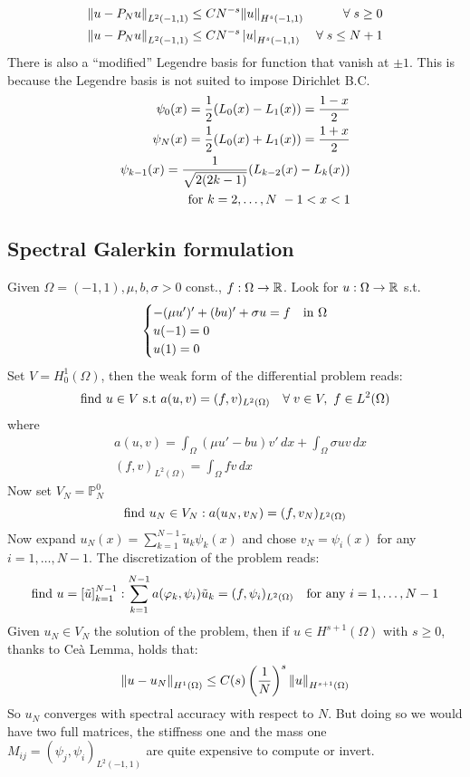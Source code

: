 \begin{align*}
    \norm{u-P_Nu}_{L^2(-1,1)} &\leq CN^{-s} \norm{u}_{H^s(-1,1)} & \forall \; s \geq 0 \\
    \norm{u-P_Nu}_{L^2(-1,1)} &\leq CN^{-s} \left\lvert u\right\rvert_{H^s(-1,1)} & \forall \; s \leq N+1 \\
\end{align*}
There is also a ``modified'' Legendre basis for function that vanish at \(\pm 1\). This is because the Legendre basis is not suited to impose Dirichlet B.C.
\begin{align*}
    \psi_0(x) = \frac{1}{2} (L_0(x) - L_1(x)) = \frac{1-x}{2} \\ 
    \psi_N(x) = \frac{1}{2} (L_0(x) + L_1(x)) = \frac{1+x}{2} \\ 
    \psi_{k-1}(x) = \frac{1}{\sqrt{2(2k-1)}} (L_{k-2}(x) - L_k(x))\\ 
    \text{for } k = 2, \ldots, N \ -1 < x < 1 \\ 
\end{align*}

\subsection{Spectral Galerkin formulation}
Given \(\Omega = (-1, 1), \mu, b, \sigma > 0\) const., \(f: \Omega \to \mathbb{R}\). Look for \(u:\Omega \to \mathbb{R}\) s.t. 
\[
    \begin{cases}
        -(\mu u')'+(bu)' + \sigma u = f & \text{in } \Omega \\
        u(-1) = 0 \\
        u(1) = 0
    \end{cases}
\]
Set \(V  = H^1_0(\Omega)\), then the weak form of the differential problem reads: 
\[
    \text{find } u \in V \text{ s.t } a(u,v) = (f,v)_{L^2(\Omega)} \quad \forall \; v \in V, \ f \in L^2(\Omega)
\]
where 
\begin{align*}
    & a(u,v) = \int_{\Omega} (\mu u' - bu)v'\, dx + \int_{\Omega} \sigma uv \, dx \\
    & (f,v)_{L^2(\Omega)} = \int_{\Omega} f v \, dx
\end{align*}
Now set \(V_N = \mathbb{P}^0_N\) 
\begin{equation}
    \text{find } u_N \in V_N: a(u_N, v_N) = (f, v_N)_{L^2(\Omega)} \label{weak_spec_galerkin_formulation}
\end{equation}
Now expand \(u_N(x) = \sum_{k=1}^{N-1} \tilde{u}_k \psi_k(x)\) and chose \(v_N = \psi_i(x)\) for any \(i = 1, \ldots, N-1\).
The discretization of the problem reads:
\[
    \text{find } u = \left[\tilde{u}\right]_{k=1}^{N-1} : \sum_{k=1}^{N-1} a(\varphi_k, \psi_i)\tilde{u}_k = (f, \psi_i)_{L^2(\Omega)} \quad \text{for any } i = 1, \ldots, N-1
\]
Given \(u_N \in V_N\) the solution of the problem, then if \(u \in H^{s+1}(\Omega)\) with \(s \geq 0\), thanks to Ceà Lemma, holds that:
\[
    \norm{u-u_N}_{H^1(\Omega)} \leq C(s)\left(\frac{1}{N}\right)^s\norm{u}_{H^{s+1}(\Omega)}
\]
So \(u_N\) converges with spectral accuracy with respect to \(N\).
But doing so we would have two full matrices, the stiffness one and the mass one  \(M_{ij} = (\psi_j, \psi_i)_{L^2(-1,1)}\) are quite expensive to compute or invert.

